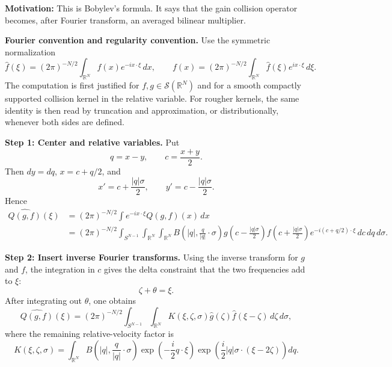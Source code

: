 \begin{solution}
\textbf{Motivation:} This is Bobylev's formula.  It says that the gain collision operator becomes, after Fourier transform, an averaged bilinear multiplier.

\par\vspace{\baselineskip}
\textbf{Fourier convention and regularity convention.}
Use the symmetric normalization
\[
\hat f(\xi)=(2\pi)^{-N/2}\int_{\mathbb{R}^N}f(x)e^{-ix\cdot\xi}\,dx,
\qquad
f(x)=(2\pi)^{-N/2}\int_{\mathbb{R}^N}\hat f(\xi)e^{ix\cdot\xi}\,d\xi.
\]
The computation is first justified for $f,g\in\mathcal{S}(\mathbb{R}^N)$ and for a smooth compactly supported collision kernel in the relative variable.  For rougher kernels, the same identity is then read by truncation and approximation, or distributionally, whenever both sides are defined.

\par\vspace{\baselineskip}
\textbf{Step 1: Center and relative variables.}
Put
\[
q=x-y,\qquad c=\frac{x+y}{2}.
\]
Then $dy=dq$, $x=c+q/2$, and
\[
x'=c+\frac{|q|\sigma}{2},
\qquad
y'=c-\frac{|q|\sigma}{2}.
\]
Hence
\[
\begin{aligned}
\widehat{Q(g,f)}(\xi)
&=(2\pi)^{-N/2}\int e^{-ix\cdot\xi}Q(g,f)(x)\,dx \\
&=(2\pi)^{-N/2}
\int_{S^{N-1}}\int_{\mathbb{R}^N}\int_{\mathbb{R}^N}
B\left(|q|,\frac{q}{|q|}\cdot\sigma\right)
g\left(c-\frac{|q|\sigma}{2}\right)
f\left(c+\frac{|q|\sigma}{2}\right)
e^{-i(c+q/2)\cdot\xi}\,dc\,dq\,d\sigma .
\end{aligned}
\]

\par\vspace{\baselineskip}
\textbf{Step 2: Insert inverse Fourier transforms.}
Using the inverse transform for $g$ and $f$, the integration in $c$ gives the delta constraint that the two frequencies add to $\xi$:
\[
\zeta+\theta=\xi.
\]
After integrating out $\theta$, one obtains
\[
\widehat{Q(g,f)}(\xi)
=(2\pi)^{-N/2}
\int_{S^{N-1}}\int_{\mathbb{R}^N}
K(\xi,\zeta,\sigma)\hat g(\zeta)\hat f(\xi-\zeta)\,d\zeta\,d\sigma,
\]
where the remaining relative-velocity factor is
\[
K(\xi,\zeta,\sigma)
=
\int_{\mathbb{R}^N}
B\left(|q|,\frac{q}{|q|}\cdot\sigma\right)
\exp\left(-\frac{i}{2}q\cdot\xi\right)
\exp\left(\frac{i}{2}|q|\sigma\cdot(\xi-2\zeta)\right)
dq.
\]


\end{solution}
